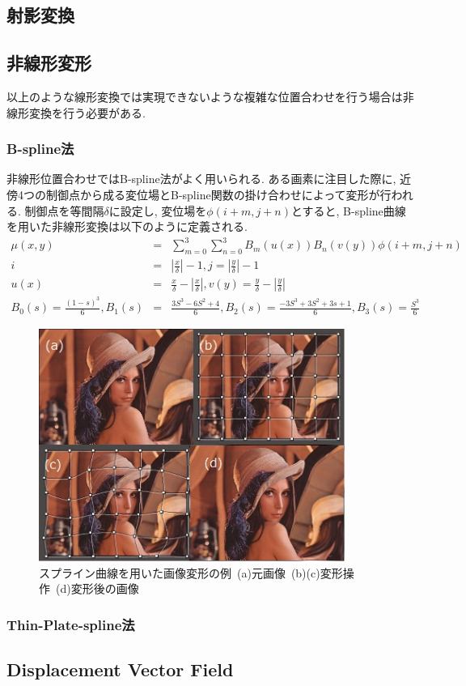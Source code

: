 \subsection{射影変換}

\subsection{非線形変形}
    以上のような線形変換では実現できないような複雑な位置合わせを行う場合は非線形変換を行う必要がある.
    \subsubsection{B-spline法}
        非線形位置合わせではB-spline法がよく用いられる.
        ある画素に注目した際に, 近傍4つの制御点から成る変位場とB-spline関数の掛け合わせによって変形が行われる.
        制御点を等間隔$\delta$に設定し, 変位場を$\phi\left(i+m, j+n\right)$とすると, B-spline曲線を用いた非線形変換は以下のように定義される.
        \begin{eqnarray} 
        \mu(x, y)&=&\sum_{m=0}^{3} \sum_{n=0}^{3} B_{m}(u(x)) B_{n}(v(y)) \phi\left(i+m, j+n\right)\\
        i&=&\left|\frac{x}{\delta}\right|-1, j=\left|\frac{y}{\delta}\right|-1\\
        u(x)&=&\frac{x}{\delta}-\left|\frac{x}{\delta}\right|, v(y)=\frac{y}{\delta}-\left|\frac{y}{\delta}\right|\\
        B_{0}(s)=\frac{(1-s)^{3}}{6}, B_{1}(s)&=&\frac{3 S^{3}-6 S^{2}+4}{6}, B_{2}(s)=\frac{-3 S^{3}+3 S^{2}+3 s+1}{6}, B_{3}(s)=\frac{S^{3}}{6}
        \end{eqnarray}
            \begin{figure}[ht]
            \begin{center}
              \includegraphics[width=10.0cm]{./8_appendix/img/spline}
            \caption{スプライン曲線を用いた画像変形の例\ (a)元画像\ (b)(c)変形操作\ (d)変形後の画像}
            \label{}
            \end{center}
        \end{figure}

    \subsubsection{Thin-Plate-spline法}

\subsection{Displacement Vector Field}